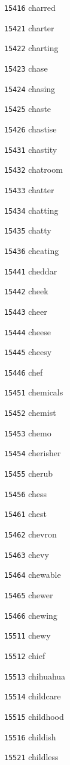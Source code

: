 \documentclass[twoside,11pt]{article}
\begin{document}
\begin{multicols}{5}
\begin{enumerate}
\item[\texttt{15416}] charred
\item[\texttt{15421}] charter
\item[\texttt{15422}] charting
\item[\texttt{15423}] chase
\item[\texttt{15424}] chasing
\item[\texttt{15425}] chaste
\item[\texttt{15426}] chastise
\item[\texttt{15431}] chastity
\item[\texttt{15432}] chatroom
\item[\texttt{15433}] chatter
\item[\texttt{15434}] chatting
\item[\texttt{15435}] chatty
\item[\texttt{15436}] cheating
\item[\texttt{15441}] cheddar
\item[\texttt{15442}] cheek
\item[\texttt{15443}] cheer
\item[\texttt{15444}] cheese
\item[\texttt{15445}] cheesy
\item[\texttt{15446}] chef
\item[\texttt{15451}] chemicals
\item[\texttt{15452}] chemist
\item[\texttt{15453}] chemo
\item[\texttt{15454}] cherisher
\item[\texttt{15455}] cherub
\item[\texttt{15456}] chess
\item[\texttt{15461}] chest
\item[\texttt{15462}] chevron
\item[\texttt{15463}] chevy
\item[\texttt{15464}] chewable
\item[\texttt{15465}] chewer
\item[\texttt{15466}] chewing
\item[\texttt{15511}] chewy
\item[\texttt{15512}] chief
\item[\texttt{15513}] chihuahua
\item[\texttt{15514}] childcare
\item[\texttt{15515}] childhood
\item[\texttt{15516}] childish
\item[\texttt{15521}] childless

\end{enumerate}
\end{multicols}
\end{document}
